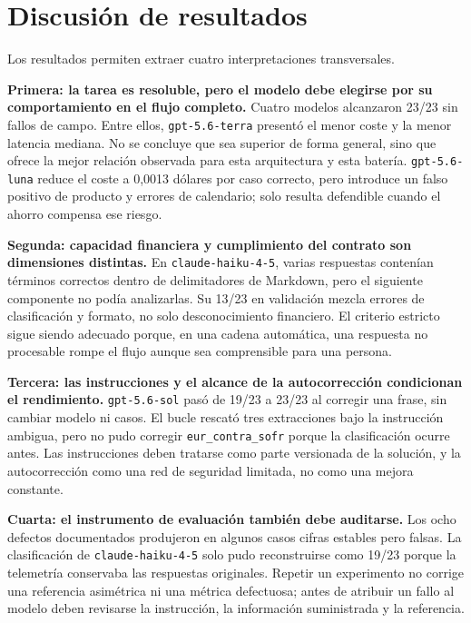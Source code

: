 \section{Discusión de resultados}
\label{sec:discusion_resultados}

Los resultados permiten extraer cuatro interpretaciones transversales.

\textbf{Primera: la tarea es resoluble, pero el modelo debe elegirse por su comportamiento en el flujo completo.} Cuatro modelos alcanzaron 23/23 sin fallos de campo. Entre ellos, \texttt{gpt-5.6-terra} presentó el menor coste y la menor latencia mediana. No se concluye que sea superior de forma general, sino que ofrece la mejor relación observada para esta arquitectura y esta batería. \texttt{gpt-5.6-luna} reduce el coste a 0,0013 dólares por caso correcto, pero introduce un falso positivo de producto y errores de calendario; solo resulta defendible cuando el ahorro compensa ese riesgo.

\textbf{Segunda: capacidad financiera y cumplimiento del contrato son dimensiones distintas.} En \texttt{claude-haiku-4-5}, varias respuestas contenían términos correctos dentro de delimitadores de Markdown, pero el siguiente componente no podía analizarlas. Su 13/23 en validación mezcla errores de clasificación y formato, no solo desconocimiento financiero. El criterio estricto sigue siendo adecuado porque, en una cadena automática, una respuesta no procesable rompe el flujo aunque sea comprensible para una persona.

\textbf{Tercera: las instrucciones y el alcance de la autocorrección condicionan el rendimiento.} \texttt{gpt-5.6-sol} pasó de 19/23 a 23/23 al corregir una frase, sin cambiar modelo ni casos. El bucle rescató tres extracciones bajo la instrucción ambigua, pero no pudo corregir \texttt{eur\_contra\_sofr} porque la clasificación ocurre antes. Las instrucciones deben tratarse como parte versionada de la solución, y la autocorrección como una red de seguridad limitada, no como una mejora constante.

\textbf{Cuarta: el instrumento de evaluación también debe auditarse.} Los ocho defectos documentados produjeron en algunos casos cifras estables pero falsas. La clasificación de \texttt{claude-haiku-4-5} solo pudo reconstruirse como 19/23 porque la telemetría conservaba las respuestas originales. Repetir un experimento no corrige una referencia asimétrica ni una métrica defectuosa; antes de atribuir un fallo al modelo deben revisarse la instrucción, la información suministrada y la referencia.

